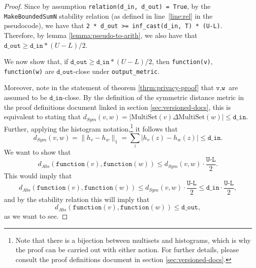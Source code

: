 \documentclass[11pt,a4paper]{article}
\theoremstyle{definition}
\newcommand{\MultiSet}{\mathrm{MultiSet}}
\newcommand{\din}{\texttt{d\_in}}
\newcommand{\dout}{\texttt{d\_out}}
\newcommand{\function}{\texttt{function}}
\begin{document}
\begin{proof}
    
    Since by assumption \texttt{relation(d\_in, d\_out) = True}, by the \texttt{MakeBoundedSumN} stability relation (as defined in line~\ref{line:rel} in the pseudocode), we have that \texttt{2 *  d\_out >= inf\_cast(d\_in, T) * (U-L)}. Therefore, by lemma \ref{lemma:pseudo-to-arith}, we also have that $\dout \geq \din * (U-L)/2$.
    
    
    
    We now show that, if $\dout \geq \din * (U-L)/2$, then \texttt{function(v)}, \texttt{function(w)} are $\dout$-close under \texttt{output\_metric}.

    
    
    Moreover, note in the statement of theorem \ref{thrm:privacy-proof} that $\texttt{v}, \texttt{w}$ are assumed to be $\din$-close. By the definition of the symmetric distance metric in the proof definitions document linked in section \ref{sec:versioned-docs}, this is equivalent to stating that $d_{Sym}(v, w) = |\MultiSet(v) \Delta \MultiSet(w)| \leq \din$. Further, applying the histogram notation,\footnote{Note that there is a bijection between multisets and histograms, which is why the proof can be carried out with either notion. For further details, please consult the proof definitions document in section \ref{sec:versioned-docs}.} it follows that
    \[
        d_{Sym}(v, w) = \lVert h_{v} - h_{w}\rVert_1 = \sum_z |h_v(z) - h_w(z)| \leq \din.
    \]
    We want to show that
    \[
        d_{Abs}(\function(v), \function(w)) \leq d_{Sym}(v, w) \cdot \dfrac{\texttt{U-L}}{2}.
    \]
    This would imply that
    \begin{equation}\label{eq:abs1}
        d_{Abs}(\function(v), \function(w)) \leq d_{Sym}(v, w) \cdot \dfrac{\texttt{U-L}}{2} \leq \din \cdot \dfrac{\texttt{U-L}}{2},
    \end{equation}
    and by the stability relation this will imply that
    \begin{equation}\label{eq:abs2}
        d_{Abs}(\function(v), \function(w)) \leq \dout,
    \end{equation}
    as we want to see. 
\end{proof}
\end{document}
